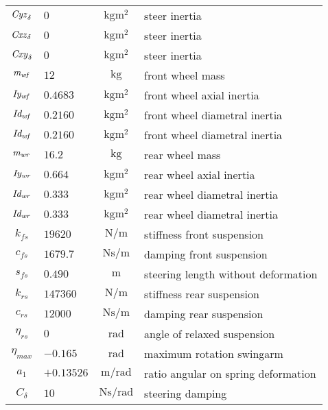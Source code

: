 \begin{longtable}{clcl}
${\it Cyz}_{\delta}$  &  $0     $ &   $\si{\kilogram\metre^2}$    &  steer inertia       \\
${\it Cxz}_{\delta}$  &  $0     $ &   $\si{\kilogram\metre^2}$    &  steer inertia       \\
${\it Cxy}_{\delta}$  &  $0     $ &   $\si{\kilogram\metre^2}$    &  steer inertia       \\ 
$\it m_{wf} $  &  $12    $ &   $\si{\kilogram}$          &  front wheel mass             \\ 
$\it Iy_{wf}$  &  $0.4683$ &   $\si{\kilogram\metre^2}$  &  front wheel axial inertia    \\
$\it Id_{wf}$  &  $0.2160$ &   $\si{\kilogram\metre^2}$  &  front wheel diametral inertia\\
$\it Id_{wf}$  &  $0.2160$ &   $\si{\kilogram\metre^2}$  &  front wheel diametral inertia\\
$\it m_{wr} $  &  $16.2  $ &   $\si{\kilogram}$          &  rear wheel mass              \\
$\it Iy_{wr}$  &  $0.664 $ &   $\si{\kilogram\metre^2}$  &  rear wheel axial inertia     \\
$\it Id_{wr}$  &  $0.333 $ &   $\si{\kilogram\metre^2}$  &  rear wheel diametral inertia \\
$\it Id_{wr}$  &  $0.333 $ &   $\si{\kilogram\metre^2}$  &  rear wheel diametral inertia \\
$k_{fs}  $   & $19620   $ & $\si{\newton/\metre}$          & stiffness front suspension          \\
$c_{fs}  $   & $1679.7  $ & $\si{\newton\second/\metre}$   & damping front suspension            \\
$s_{fs}  $   & $0.490   $ & $\si{\metre}$                  & steering length without deformation \\
$k_{rs}  $   & $147360  $ & $\si{\newton/\metre}$          & stiffness rear suspension           \\
$c_{rs}  $   & $12000   $ & $\si{\newton\second/\metre}$   & damping rear suspension             \\
$\eta_{rs}$  & $0       $ & $\si{\radian}$                 & angle of relaxed suspension         \\
$\eta_{max}$ & $-0.165  $ & $\si{\radian}$                 & maximum rotation swingarm           \\
$a_1    $    & $+0.13526$ & $\si{\metre/\radian}$          & ratio angular on spring deformation \\
$C_\delta$   & $10      $ & $\si{\newton\second/\radian}$  & steering damping                    \\

\end{longtable}
